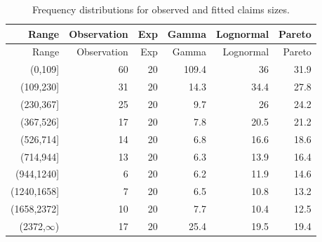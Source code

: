 \documentclass[landscape, 20pt]{extreport}
\theoremstyle{definition}
\theoremstyle{definition}
\theoremstyle{definition}
\theoremstyle{definition}
\theoremstyle{remark}
\begin{document}
\begin{longtable}[]{@{}rrrrrr@{}}
\caption{\label{tab:tableFitted} Frequency distributions for observed and fitted claims sizes.}\tabularnewline
\toprule
Range & Observation & Exp & Gamma & Lognormal & Pareto \\
\midrule
\endfirsthead
\toprule
Range & Observation & Exp & Gamma & Lognormal & Pareto \\
\midrule
\endhead
(0,109{]} & 60 & 20 & 109.4 & 36 & 31.9 \\
(109,230{]} & 31 & 20 & 14.3 & 34.4 & 27.8 \\
(230,367{]} & 25 & 20 & 9.7 & 26 & 24.2 \\
(367,526{]} & 17 & 20 & 7.8 & 20.5 & 21.2 \\
(526,714{]} & 14 & 20 & 6.8 & 16.6 & 18.6 \\
(714,944{]} & 13 & 20 & 6.3 & 13.9 & 16.4 \\
(944,1240{]} & 6 & 20 & 6.2 & 11.9 & 14.6 \\
(1240,1658{]} & 7 & 20 & 6.5 & 10.8 & 13.2 \\
(1658,2372{]} & 10 & 20 & 7.7 & 10.4 & 12.5 \\
(2372,\(\infty\)) & 17 & 20 & 25.4 & 19.5 & 19.4 \\
\bottomrule
\end{longtable}
\end{document}

